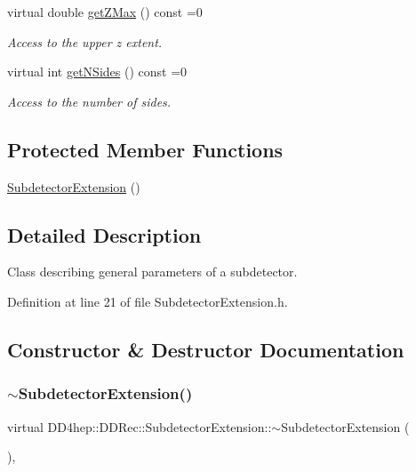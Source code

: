 \begin{DoxyCompactItemize}
virtual double \hyperlink{class_d_d4hep_1_1_d_d_rec_1_1_subdetector_extension_aea56290179f8271d6a2a3be1658d9b47}{get\+Z\+Max} () const =0
\begin{DoxyCompactList}\small\item\em Access to the upper z extent. \end{DoxyCompactList}\item 
virtual int \hyperlink{class_d_d4hep_1_1_d_d_rec_1_1_subdetector_extension_a7bed401e919e8eaaf2dfdf8fe89a3697}{get\+N\+Sides} () const =0
\begin{DoxyCompactList}\small\item\em Access to the number of sides. \end{DoxyCompactList}\end{DoxyCompactItemize}
\subsection*{Protected Member Functions}
\begin{DoxyCompactItemize}
\item 
\hyperlink{class_d_d4hep_1_1_d_d_rec_1_1_subdetector_extension_ae04b137994a497fa056f2cfc84aa0eb9}{Subdetector\+Extension} ()
\end{DoxyCompactItemize}


\subsection{Detailed Description}
Class describing general parameters of a subdetector. 

Definition at line 21 of file Subdetector\+Extension.\+h.



\subsection{Constructor \& Destructor Documentation}
\hypertarget{class_d_d4hep_1_1_d_d_rec_1_1_subdetector_extension_aa1aec61c92f4005d502f9419050f1b9b}{}\label{class_d_d4hep_1_1_d_d_rec_1_1_subdetector_extension_aa1aec61c92f4005d502f9419050f1b9b} 
\subsubsection{\texorpdfstring{$\sim$\+Subdetector\+Extension()}{~SubdetectorExtension()}}
{\footnotesize\ttfamily virtual D\+D4hep\+::\+D\+D\+Rec\+::\+Subdetector\+Extension\+::$\sim$\+Subdetector\+Extension (\begin{DoxyParamCaption}{ }\end{DoxyParamCaption})\hspace{0.3cm}{\ttfamily [inline]}, {\ttfamily [virtual]}}




